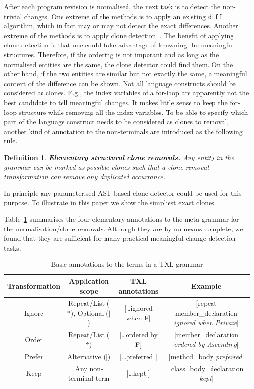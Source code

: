 \documentclass[10pt, conference, compsocconf]{IEEEtran}
\newtheorem{definition}{Definition}
\begin{document}
After each program revision is normalised, the next task is to detect the non-trivial changes. One extreme of  the methods is to apply an existing {\tt diff} algorithm, which in fact may or may not detect the exact differences.  Another extreme of the methods is to apply clone detection~\cite{DBLP:conf/iwpc/RoyC08a}. The benefit of applying clone detection is that one could take advantage of knowning the meaningful structures. Therefore, if the ordering is not imporant and as long as the normalised entities are the same, the clone detector could find them. On  the other hand, if the two entities are similar but not exactly the same, a meaningful context of the difference can be shown.
Not all language constructs should be considered as clones. E.g., the index variables of a for-loop are apparently not the best candidate to tell meaningful changes. It makes little sense to keep the for-loop structure while removing all the index variables.
To be able to specify which part of the language construct needs to be considered as clones to removal, another kind of annotation to the non-terminals are introduced as the following rule. 

\begin{definition}
{\bf Elementary structural clone removals.\label{defn:norm5}} Any entity in the grammar can be marked as possible clones such that a clone removal transformation can remove any duplicated occurrance. 
\end{definition}

In principle any parameterised AST-based clone detector could be used for this purpose. To illustrate in this paper we show the simpliest exact clones.

Table~\ref{table:rule} summarises the four elementary annotations to the meta-grammar for the normalisation/clone removals. Although they are by no means complete, we found that they are sufficient for many practical meaningful change detection tasks.
\begin{table}\centering
\caption{Basic annotations to the terms in a TXL grammar}\label{table:rule}
\begin{tabular}{|c|c|c|c|}\hline
\bf Transformation & \bf Application scope & \bf TXL annotations & \bf Example \\\hline\hline
Ignore & Repeat/List ($*$), Optional ($|$) & [\ldots ignored when F] & [repeat member\_declaration \emph{ignored when Private}]\\\hline
Order & Repeat/List ($*$) & [\ldots ordered by F] & [member\_declaration \emph{ordered by Ascending}] \\\hline
Prefer & Alternative ($|$) & [\ldots preferred ] & [method\_body \emph{preferred}] \\\hline
Keep & Any non-terminal term & [\ldots kept ] & [class\_body\_declaration \emph{kept}] \\\hline
\end{tabular}
\end{table}
\end{document}
